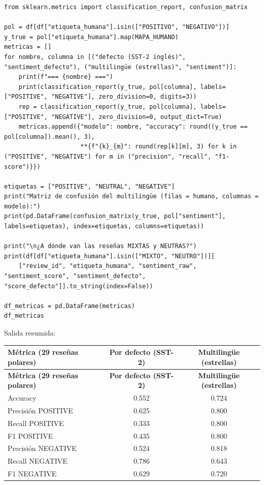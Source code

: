\documentclass[12pt,a4paper]{article}
\begin{document}
\begin{lstlisting}[style=codigo]
from sklearn.metrics import classification_report, confusion_matrix

pol = df[df["etiqueta_humana"].isin(["POSITIVO", "NEGATIVO"])]
y_true = pol["etiqueta_humana"].map(MAPA_HUMANO)
metricas = []
for nombre, columna in [("defecto (SST-2 inglés)", "sentiment_defecto"), ("multilingüe (estrellas)", "sentiment")]:
    print(f"=== {nombre} ===")
    print(classification_report(y_true, pol[columna], labels=["POSITIVE", "NEGATIVE"], zero_division=0, digits=3))
    rep = classification_report(y_true, pol[columna], labels=["POSITIVE", "NEGATIVE"], zero_division=0, output_dict=True)
    metricas.append({"modelo": nombre, "accuracy": round((y_true == pol[columna]).mean(), 3),
                     **{f"{k}_{m}": round(rep[k][m], 3) for k in ("POSITIVE", "NEGATIVE") for m in ("precision", "recall", "f1-score")}})

etiquetas = ["POSITIVE", "NEUTRAL", "NEGATIVE"]
print("Matriz de confusión del multilingüe (filas = humano, columnas = modelo):")
print(pd.DataFrame(confusion_matrix(y_true, pol["sentiment"], labels=etiquetas), index=etiquetas, columns=etiquetas))

print("\n¿A dónde van las reseñas MIXTAS y NEUTRAS?")
print(df[df["etiqueta_humana"].isin(["MIXTO", "NEUTRO"])][
    ["review_id", "etiqueta_humana", "sentiment_raw", "sentiment_score", "sentiment_defecto", "score_defecto"]].to_string(index=False))

df_metricas = pd.DataFrame(metricas)
df_metricas
\end{lstlisting}

Salida resumida:

{\small\renewcommand{\arraystretch}{1.3}
\begin{longtable}{|l|c|c|}
\hline
\textbf{Métrica (29 reseñas polares)} & \textbf{Por defecto (SST-2)} & \textbf{Multilingüe (estrellas)} \\ \hline
\endfirsthead
\hline
\textbf{Métrica (29 reseñas polares)} & \textbf{Por defecto (SST-2)} & \textbf{Multilingüe (estrellas)} \\ \hline
\endhead
Accuracy & 0.552 & 0.724 \\ \hline
Precisión POSITIVE & 0.625 & 0.800 \\ \hline
Recall POSITIVE & 0.333 & 0.800 \\ \hline
F1 POSITIVE & 0.435 & 0.800 \\ \hline
Precisión NEGATIVE & 0.524 & 0.818 \\ \hline
Recall NEGATIVE & 0.786 & 0.643 \\ \hline
F1 NEGATIVE & 0.629 & 0.720 \\ \hline
\end{longtable}}
\end{document}
